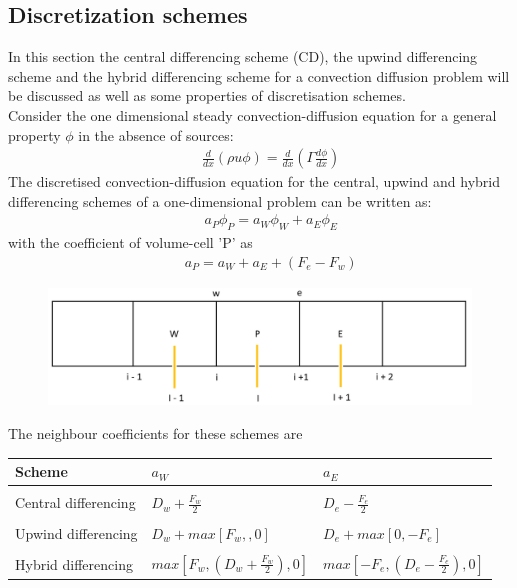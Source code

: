 \subsection{Discretization schemes}
In this section the central differencing scheme (CD), the upwind differencing scheme and the hybrid differencing scheme for a convection diffusion problem will be discussed as well as some properties of discretisation schemes. \\
 
Consider the one dimensional steady convection-diffusion equation for a general property $\phi$ in the absence of sources:
\begin{align}
&&	\frac{d}{dx} (\rho u \phi) = \frac{d}{dx}(\Gamma \frac{d \phi}{dx})
\end{align} 
The discretised convection-diffusion equation for the central, upwind and hybrid differencing schemes of a one-dimensional problem can be written as:
\begin{align}
&& a_P \phi_P = a_W\phi_W + a_E\phi_E	
\end{align}
with the coefficient of volume-cell 'P' as
\begin{align}
&&	a_P = a_W + a_E + (F_e-F_w)
\end{align}

\begin{figure}[H]
	\centering
	\includegraphics[width= 1\textwidth]{Images/fig1.png}
	\label{fig:fig6}
\end{figure}

The neighbour coefficients for these schemes are
\begin{table}[H]
	\centering
	\begin{tabular}{|l|l|l|}
		\hline
		Scheme &	$a_W$     & $a_E$   \\ \hline \vspace{-0.3cm}
		& & \\
		Central differencing & $D_w + \frac{F_w}{2}$  & $D_e - \frac{F_e}{2}$ \\ \hline \vspace{-0.3cm}
		& & \\
		Upwind differencing & $D_w + max\left[F_w, ,0\right]$  & $ D_e + max\left[0, -F_e\right]$ \\ \hline \vspace{-0.3cm}
		& & \\
		Hybrid differencing & $max\left[F_w, \left(D_w + \frac{F_w}{2}\right),0\right]$  & $max\left[-F_e, \left(D_e - \frac{F_e}{2}\right),0\right]$ \\ \hline
	\end{tabular}
\end{table}

